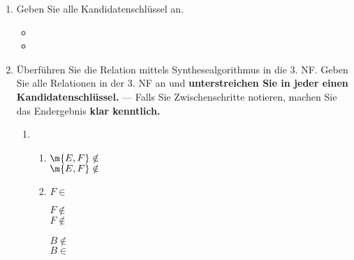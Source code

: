 \documentclass{bschlangaul-aufgabe}
\begin{document}
\begin{enumerate}


\item Geben Sie alle Kandidatenschlüssel an.

\begin{bAntwort}
\begin{itemize}
\item {}
\item {}
\end{itemize}
\end{bAntwort}


\item Überführen Sie die Relation mittels Synthesealgorithmus in die 3.
NF. Geben Sie alle Relationen in der 3. NF an und \textbf{unterstreichen
Sie in jeder einen Kandidatenschlüssel.} — Falls Sie Zwischenschritte
notieren, machen Sie das Endergebnis \textbf{klar kenntlich.}

\begin{bAntwort}
\begin{enumerate}
\item {}
\begin{enumerate}
\item {}


$\m{E, F} \notin$ \\
$\m{E, F} \notin$ 


\item {}


$F \in$ 


$F \notin$ \\
$F \notin$ 


$B \notin$ \\
$B \in$ 



\end{enumerate}
\end{enumerate}
\end{bAntwort}
\end{enumerate}
\end{document}
